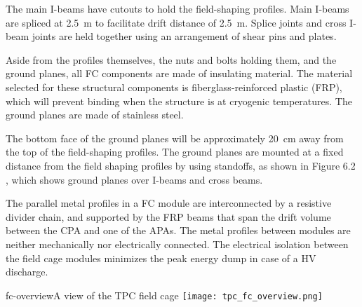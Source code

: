 The main I-beams have cutouts to hold the field-shaping profiles. Main I-beams are spliced at 2.5~m to facilitate drift distance %
of 2.5~m. Splice joints and cross I-beam joints are held together using an arrangement of shear pins and plates. 

Aside from the profiles themselves, the nuts and bolts holding them, and the ground planes, all FC components are made of insulating material. The material selected for these structural components is fiberglass-reinforced plastic (FRP), which will prevent binding when the structure is at cryogenic temperatures. The ground planes are made of stainless steel. 


The bottom face  of the ground planes will be approximately 20~cm away from the top of the field-shaping profiles. The ground planes are mounted at a fixed distance from the field shaping profiles by using standoffs, as shown in Figure 6.2 , which shows ground planes over I-beams and cross beams.

The parallel metal profiles in a FC module 
 are interconnected by a resistive divider chain, and supported by the FRP beams that span the drift volume between the CPA and one of the APAs. 
The metal profiles between modules are neither mechanically nor electrically connected. The electrical isolation between the field cage modules minimizes the peak energy dump in case of a HV discharge.


\begin{cdrfigure}{fc-overview}{A view of the TPC field cage}
\texttt{[image: tpc\_fc\_overview.png]}
\end{cdrfigure}

